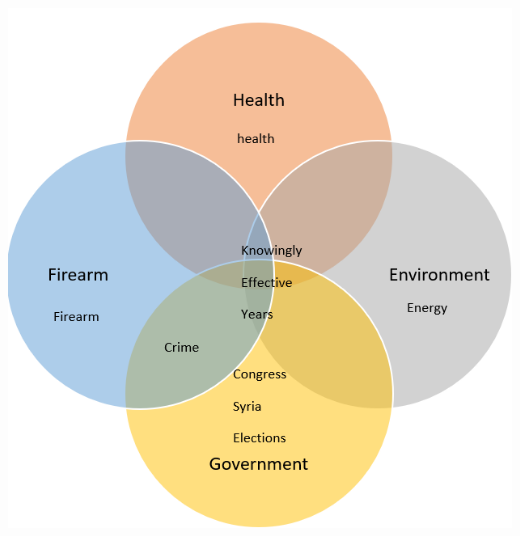 \documentclass[11pt,a4paper]{article}
\begin{document}
 
 \includegraphics[scale=.60]{figs/Venn.PNG}
 
  
\end{document}
